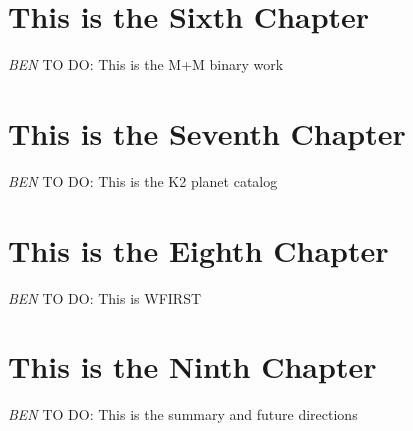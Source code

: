 \documentclass[12pt]{caltech_thesis}
\newcommand{\todo}[3]{{\color{#2} \emph{#1} TO DO: #3}}
\newcommand{\btmtodo}[1]{\todo{BEN}{red}{#1}}
\begin{document}
\chapter{This is the Sixth Chapter}

\btmtodo{This is the M+M binary work}

\chapter{This is the Seventh Chapter}

\btmtodo{This is the K2 planet catalog}

\chapter{This is the Eighth Chapter}
\label{chap:wfirst}

\btmtodo{This is WFIRST}

\chapter{This is the Ninth Chapter}

\btmtodo{This is the summary and future directions}

\printbibliography[heading=bibintoc]
%





\end{document}
